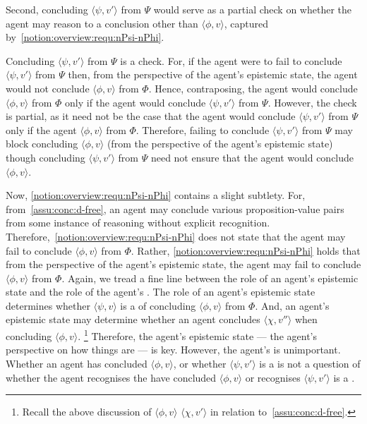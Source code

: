 \begin{note}
  Second, concluding \(\langle \psi,v' \rangle\) from \(\Psi\) would serve as a partial check on whether the agent may reason to a conclusion other than \(\langle \phi,v \rangle\), captured by~\ref{notion:overview:requ:nPsi-nPhi}.

  Concluding \(\langle \psi,v' \rangle\) from \(\Psi\) is a check.
  For, if the agent were to fail to conclude \(\langle \psi,v' \rangle\) from \(\Psi\) then, from the perspective of the agent's epistemic state, the agent would not conclude \(\langle \phi,v \rangle\) from \(\Phi\).
  Hence, contraposing, the agent would conclude \(\langle \phi,v \rangle\) from \(\Phi\) only if the agent would conclude \(\langle \psi,v' \rangle\) from \(\Psi\).
  However, the check is partial, as it need not be the case that the agent would conclude \(\langle \psi,v' \rangle\) from \(\Psi\) only if the agent \(\langle \phi,v \rangle\) from \(\Phi\).
  Therefore, failing to conclude \(\langle \psi,v' \rangle\) from \(\Psi\) may block concluding \(\langle \phi,v \rangle\) (from the perspective of the agent's epistemic state) though concluding \(\langle \psi,v' \rangle\) from \(\Psi\) need not ensure that the agent would conclude \(\langle \phi,v \rangle\).

  Now, \ref{notion:overview:requ:nPsi-nPhi} contains a slight subtlety.
  For, from~\autoref{assu:conc:d-free}, an agent may conclude various proposition-value pairs from some instance of reasoning without explicit recognition.
  Therefore,~\ref{notion:overview:requ:nPsi-nPhi} does not state that the agent may fail to conclude \(\langle \phi,v \rangle\) from \(\Phi\).
  Rather, \ref{notion:overview:requ:nPsi-nPhi} holds that from the perspective of the agent's epistemic state, the agent may fail to conclude \(\langle \phi,v \rangle\) from \(\Phi\).
  Again, we tread a fine line between the role of an agent's epistemic state and the role of the agent's \stance{}.
  The role of an agent's epistemic state determines whether \(\langle \psi,v \rangle\) is a \requ{} of concluding \(\langle \phi,v \rangle\) from \(\Phi\).
  And, an agent's epistemic state may determine whether an agent concludes \(\langle \chi,v'' \rangle\) when concluding \(\langle \phi,v \rangle\).%
  \footnote{
    Recall the above discussion of \(\langle \phi,v \rangle\) \indicatePr{} \(\langle \chi,v' \rangle\) in relation to~\autoref{assu:conc:d-free}.
  }
  Therefore, the agent's epistemic state --- the agent's perspective on how things are --- is key.
  However, the agent's \stance{} is unimportant.
  Whether an agent has concluded \(\langle \phi,v \rangle\), or whether \(\langle \psi,v' \rangle\) is a \requ{} is not a question of whether the agent recognises the have concluded \(\langle \phi,v \rangle\) or recognises \(\langle \psi,v' \rangle\) is a \requ{}.


\end{note}
